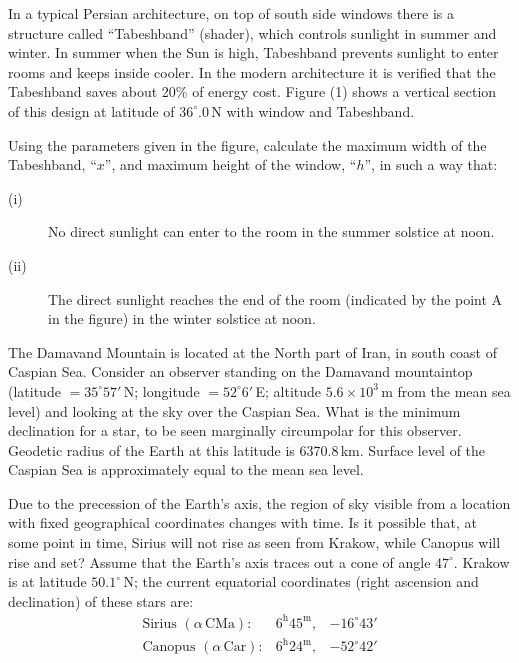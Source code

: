 In a typical Persian architecture, on top of south side windows there is a
structure called ``Tabeshband'' (shader), which controls sunlight in summer
and winter. In summer when the Sun is high, Tabeshband prevents sunlight to
enter rooms and keeps inside cooler. In the modern architecture it is verified
that the Tabeshband saves about 20\% of energy cost. Figure (1) shows a
vertical section of this design at latitude of $36^\circ\!.0$\,N with window
and Tabeshband.

Using the parameters given in the figure, calculate the maximum width of the
Tabeshband, ``$x$'', and maximum height of the window, ``$h$'', in such a way
that:
\begin{description}
\item[(i)] No direct sunlight can enter to the room in the summer solstice at
  noon.
\item[(ii)] The direct sunlight reaches the end of the room (indicated by the
  point A in the figure) in the winter solstice at noon.
\end{description}


The Damavand Mountain is located at the North part of Iran, in south coast of
Caspian Sea. Consider an observer standing on the Damavand mountaintop
(latitude $= 35^\circ 57'$\,N; longitude $= 52^\circ 6'$\,E; altitude
$5.6 \times 10^{3}$\,m from the mean sea level) and looking at the sky over
the Caspian Sea. What is the minimum declination for a star, to be seen
marginally circumpolar for this observer. Geodetic radius of the Earth at this
latitude is 6370.8\,km. Surface level of the Caspian Sea is approximately
equal to the mean sea level.

Due to the precession of the Earth's axis, the region of sky visible from a
location with fixed geographical coordinates changes with time. Is it possible
that, at some point in time, Sirius will not rise as seen from Krakow, while
Canopus will rise and set? Assume that the Earth's axis traces out a cone of
angle $47^\circ$. Krakow is at latitude $50.1^\circ$\,N; the current
equatorial coordinates (right ascension and declination) of these stars are:
\[
\begin{array}{lll}
\text{Sirius } (\alpha\,\text{CMa}): &
  6^{\mathrm{h}}45^{\mathrm{m}}, & -16^\circ 43' \\
\text{Canopus } (\alpha\,\text{Car}): &
  6^{\mathrm{h}}24^{\mathrm{m}}, & -52^\circ 42'
\end{array}
\]

